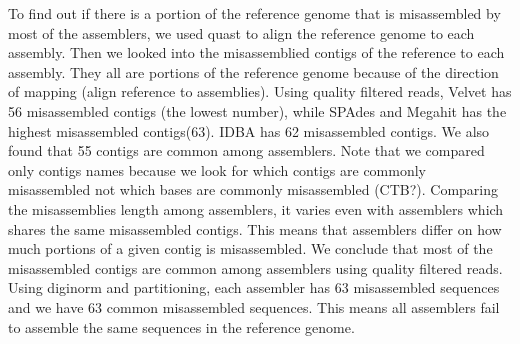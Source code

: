 To find out if there is a portion of the reference genome that is misassembled by most of the assemblers, we used quast \cite{quast} to align the reference genome to each assembly. Then we looked into the misassemblied contigs of the reference to each assembly. They all are portions of the reference genome because of the direction of mapping (align reference to assemblies). Using quality filtered reads, Velvet has 56 misassembled contigs (the lowest number), while SPAdes and Megahit has the highest misassembled contigs(63). IDBA has 62 misassembled contigs.  We also found that 55 contigs are common among assemblers. Note that we compared only contigs names because we look for which contigs are commonly misassembled not which bases are commonly misassembled (CTB?). Comparing the misassemblies length among assemblers, it varies even with assemblers which shares the same misassembled contigs. This means that assemblers differ on how much portions of a given contig is misassembled. We conclude that most of the misassembled contigs are common among assemblers using quality filtered reads. 
Using diginorm and partitioning, each assembler has 63 misassembled sequences and we have 63 common misassembled sequences. This means all assemblers fail to assemble the same sequences in the reference genome. 


